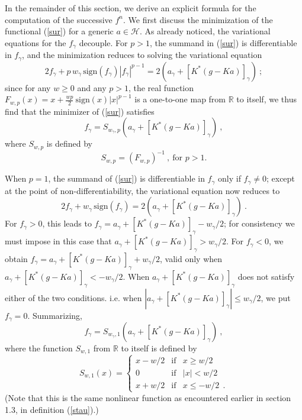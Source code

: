 \documentclass[10pt]{article}
\def\cH{\mathcal{H}}
\def\K{K^*}
\def\fg{f_{\gamma}}
\def\ag{w_{\gamma}}
\newcommand\eref[1]{(\ref{#1})}
\begin{document}
In the remainder of this section, we derive an explicit formula
for the computation of the successive
$f^n$. We first discuss the minimization of the functional
\eref{sur} for a generic $a \in \cH$.
As already noticed, the variational equations for the $\fg$
decouple. For $p>1$, the summand in \eref{sur} is differentiable in $\fg$, and
the minimization reduces to solving the variational equation
\begin{equation*}
2 \fg + p \, \ag \, \mbox{sign}(\fg) |\fg|^{p-1} = 2( a_{\gamma} + [\K (g-K
a)]_{\gamma}) ~;
\end{equation*}
since for any  $w \geq 0$ and any $p>1$,
the real function $F_{w,p}(x)=x+ {\frac{w p}{2}} ~ \mbox{sign}(x)|x|^{p-1}$ is
a one-to-one map
from $\mathbb{R}$ to itself,
we thus find that the minimizer of \eref{sur} satisfies
\begin{equation}
\label{solcomp-pneq1}
\fg= S_{\ag,p}( a_{\gamma} + [\K (g-K a)]_{\gamma}) ~,
\end{equation}
where $S_{w,p}$ is defined by
\begin{equation}
\label{S-pneq1}
S_{w,p}= \left( F_{w,p} \right)^{-1} ~, ~ \mbox{for } p>1.
\end{equation}

When $p=1$, the summand of  \eref{sur} is differentiable in $\fg$
only if $\fg \neq 0$; except at the point of non-differentiability,
the variational equation now reduces to
\begin{equation*}
2 \fg + \ag \,  \mbox{sign}(\fg) = 2 ( a_{\gamma} + [\K (g-K a)]_{\gamma})
~.
\end{equation*}
For $\fg>0$, this leads to $\fg= a_{\gamma} + [\K (g-K
a)]_{\gamma} -
\ag/2$; for consistency we must impose
in this case that $a_{\gamma} + [\K (g-K
a)]_{\gamma}
> \ag/2$. For $\fg <0$, we obtain
$\fg=a_{\gamma} + [\K (g-K
a)]_{\gamma}+\ag/2$, valid only when
$a_{\gamma} + [\K (g-K
a)]_{\gamma} < -\ag/2$. When
$a_{\gamma} + [\K (g-K
a)]_{\gamma}$ does not satisfy either of the two
conditions. i.e. when $|a_{\gamma} + [\K (g-K
a)]_{\gamma}| \leq \ag/2$,
we put $\fg =0$. Summarizing,
\begin{equation}
\label{solcomp-peq1}
\fg = S_{\ag,1}(a_{\gamma}+[ \K( g - K a)]_{\gamma}) ~,
\end{equation}
where the function $S_{w,1}$ from $\mathbb{R}$ to itself is defined by
\begin{equation}
\label{S-peq1}
S_{w,1}(x)=\left\{ \begin{array}{ccl} {x-w/2} & {\mbox{if}} & {x \geq w/2} \\
{0} & {\mbox{if}} & {|x| < w/2} \\ {x+w/2 }& {\mbox{if}} & {x \leq -w/2  ~~.}
\end{array} \right.
\end{equation}
(Note that this is the same nonlinear function as encountered
earlier in section 1.3, in definition \eref{stau}.)
\end{document}
